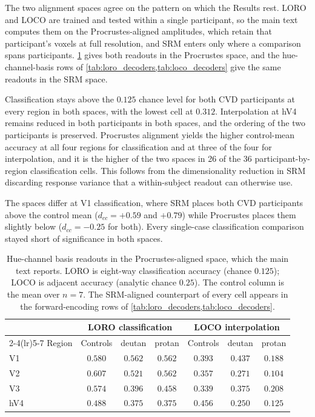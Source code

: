 The two alignment spaces agree on the pattern on which the Results rest. LORO and LOCO are trained and tested within a single participant, so the main text computes them on the Procrustes-aligned amplitudes, which retain that participant's voxels at full resolution, and SRM enters only where a comparison spans participants. \cref{tab:alignment} gives both readouts in the Procrustes space, and the hue-channel-basis rows of \cref{tab:loro_decoders,tab:loco_decoders} give the same readouts in the SRM space.

Classification stays above the $0.125$ chance level for both CVD participants at every region in both spaces, with the lowest cell at $0.312$. Interpolation at hV4 remains reduced in both participants in both spaces, and the ordering of the two participants is preserved. Procrustes alignment yields the higher control-mean accuracy at all four regions for classification and at three of the four for interpolation, and it is the higher of the two spaces in 26 of the 36 participant-by-region classification cells. This follows from the dimensionality reduction in SRM discarding response variance that a within-subject readout can otherwise use.

The spaces differ at V1 classification, where SRM places both CVD participants above the control mean ($d_{cc} = +0.59$ and $+0.79$) while Procrustes places them slightly below ($d_{cc} = -0.25$ for both). Every single-case classification comparison stayed short of significance in both spaces.

\begin{table}[h]
\centering
\caption{Hue-channel basis readouts in the Procrustes-aligned space, which the main text reports. LORO is eight-way classification accuracy (chance $0.125$); LOCO is adjacent accuracy (analytic chance $0.25$). The control column is the mean over $n = 7$. The SRM-aligned counterpart of every cell appears in the forward-encoding rows of \cref{tab:loro_decoders,tab:loco_decoders}.}
\label{tab:alignment}
\begin{tabular}{lcccccc}
\toprule
& \multicolumn{3}{c}{LORO classification} & \multicolumn{3}{c}{LOCO interpolation} \\
\cmidrule(lr){2-4}\cmidrule(lr){5-7}
Region & Controls & deutan & protan & Controls & deutan & protan \\
\midrule
V1  & $0.580$ & $0.562$ & $0.562$ & $0.393$ & $0.437$ & $0.188$ \\
V2  & $0.607$ & $0.521$ & $0.562$ & $0.357$ & $0.271$ & $0.104$ \\
V3  & $0.574$ & $0.396$ & $0.458$ & $0.339$ & $0.375$ & $0.208$ \\
hV4 & $0.488$ & $0.375$ & $0.375$ & $0.456$ & $0.250$ & $0.125$ \\
\bottomrule
\end{tabular}
\end{table}


